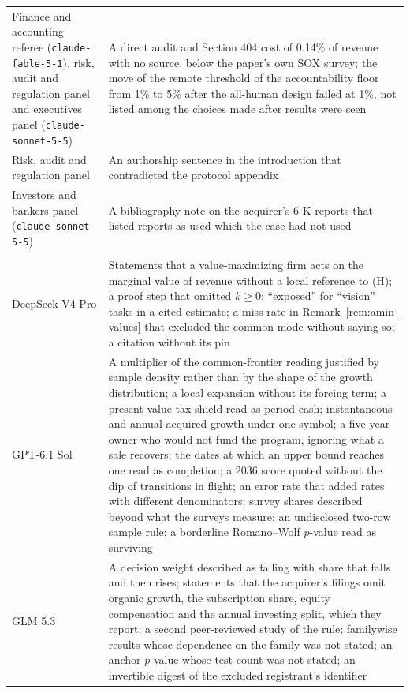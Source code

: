 {\begin{longtable}{@{}p{}p{}@{}}
Finance and accounting referee (\texttt{claude-fable-5-1}), risk, audit and regulation panel and executives panel (\texttt{claude-sonnet-5-5}) & A direct audit and Section 404 cost of 0.14\% of revenue with no source, below the paper's own SOX survey; the move of the remote threshold of the accountability floor from 1\% to 5\% after the all-human design failed at 1\%, not listed among the choices made after results were seen\\
Risk, audit and regulation panel & An authorship sentence in the introduction that contradicted the protocol appendix\\
Investors and bankers panel (\texttt{claude-sonnet-5-5}) & A bibliography note on the acquirer's 6-K reports that listed reports as used which the case had not used\\
\addlinespace\multicolumn{2}{@{}l}{\emph{Outside reviews of the third version (Section~\ref{supp:protocol-outside})}}\\
DeepSeek V4 Pro & Statements that a value-maximizing firm acts on the marginal value of revenue without a local reference to (H); a proof step that omitted $k\ge0$; ``exposed'' for ``vision'' tasks in a cited estimate; a miss rate in Remark~\ref{rem:amin-values} that excluded the common mode without saying so; a citation without its pin\\
GPT-6.1 Sol & A multiplier of the common-frontier reading justified by sample density rather than by the shape of the growth distribution; a local expansion without its forcing term; a present-value tax shield read as period cash; instantaneous and annual acquired growth under one symbol; a five-year owner who would not fund the program, ignoring what a sale recovers; the dates at which an upper bound reaches one read as completion; a 2036 score quoted without the dip of transitions in flight; an error rate that added rates with different denominators; survey shares described beyond what the surveys measure; an undisclosed two-row sample rule; a borderline Romano--Wolf $p$-value read as surviving\\
GLM 5.3 & A decision weight described as falling with share that falls and then rises; statements that the acquirer's filings omit organic growth, the subscription share, equity compensation and the annual investing split, which they report; a second peer-reviewed study of the rule; familywise results whose dependence on the family was not stated; an anchor $p$-value whose test count was not stated; an invertible digest of the excluded registrant's identifier\\

\end{longtable}}
